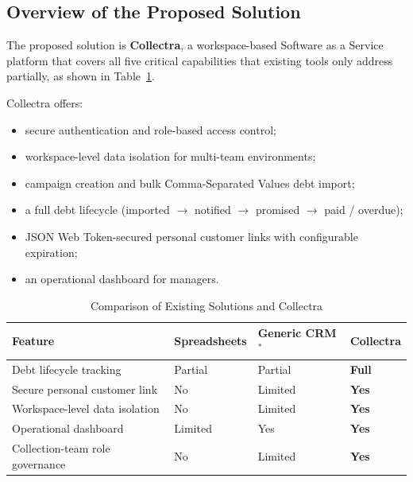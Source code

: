 ﻿\documentclass[12pt,a4paper]{report}
\newcommand{\reporttablesetup}{%
  \small%
  \microtypesetup{activate=false}%
  \setlength{\tabcolsep}{5pt}%
  \renewcommand{\arraystretch}{1.38}%
  \arrayrulecolor{framegray}%
}
\begin{document}
\subsection{Overview of the Proposed Solution}

The proposed solution is \textbf{Collectra}, a workspace-based Software as a Service platform that
covers all five critical capabilities that existing tools only address partially,
as shown in Table~\ref{tab:comparison}.

Collectra offers:
\begin{itemize}
  \item secure authentication and role-based access control;
  \item workspace-level data isolation for multi-team environments;
  \item campaign creation and bulk Comma-Separated Values debt import;
  \item a full debt lifecycle (imported $\to$ notified $\to$ promised $\to$ paid / overdue);
  \item JSON Web Token-secured personal customer links with configurable expiration;
  \item an operational dashboard for managers.
\end{itemize}

\begin{table}[H]
  \centering
  \reporttablesetup
  \begin{tabular}{|p{6.6cm}|p{2.35cm}|p{2.35cm}|p{2.45cm}|}
    \hline
    \rowcolor{accentblue!10}
    \textbf{Feature} & \textbf{Spreadsheets} & \textbf{Generic CRM}$^{\ast}$ & \textbf{Collectra} \\
    \hline
    Debt lifecycle tracking          & Partial & Partial & \textbf{Full} \\
    \hline
    Secure personal customer link    & No      & Limited & \textbf{Yes} \\
    \hline
    Workspace-level data isolation   & No      & Limited & \textbf{Yes} \\
    \hline
    Operational dashboard            & Limited & Yes     & \textbf{Yes} \\
    \hline
    Collection-team role governance  & No      & Limited & \textbf{Yes} \\
    \hline
  \end{tabular}
  \caption{Comparison of Existing Solutions and Collectra}
  \label{tab:comparison}
\end{table}
\end{document}
